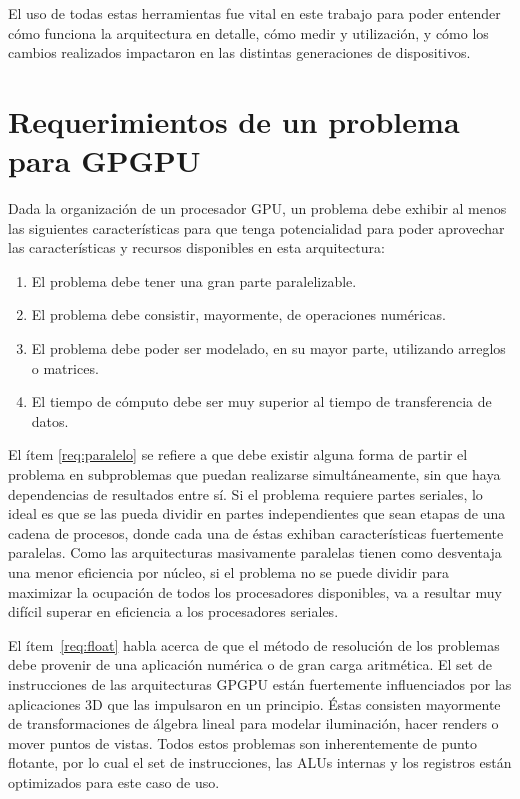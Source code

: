 El uso de todas estas herramientas fue vital en este trabajo para poder entender c\'omo funciona la arquitectura en detalle, c\'omo medir \performance{} y utilizaci\'on, y c\'omo los cambios realizados impactaron en las distintas generaciones de dispositivos.

\section{Requerimientos de un problema para GPGPU}

Dada la organizaci\'on de un procesador GPU, un problema debe exhibir al menos las siguientes caracter\'isticas para que tenga potencialidad para poder aprovechar las caracter\'isticas y recursos disponibles en esta arquitectura:

\begin{enumerate}
  \item \label{req:paralelo} El problema debe tener una gran parte paralelizable.
  \item \label{req:float} El problema debe consistir, mayormente, de operaciones num\'ericas.
  \item \label{req:matrix} El problema debe poder ser modelado, en su mayor parte, utilizando arreglos o matrices.
  \item \label{req:transf} El tiempo de c\'omputo debe ser muy superior al tiempo de transferencia de datos.
\end{enumerate}

El \'item \ref{req:paralelo} se refiere a que debe existir alguna forma de partir el problema en subproblemas que puedan realizarse simult\'aneamente, sin que haya dependencias de
resultados entre s\'i.
Si el problema requiere partes seriales, lo ideal es que se las pueda dividir en partes independientes que sean etapas de una cadena de procesos, donde cada una de \'estas exhiban caracter\'isticas fuertemente paralelas.
Como las arquitecturas masivamente paralelas tienen como desventaja una menor eficiencia por n\'ucleo, si el problema no se puede dividir para maximizar la ocupaci\'on de todos los procesadores disponibles, va a resultar muy dif\'icil superar en eficiencia a los procesadores seriales.

El ítem~\ref{req:float} habla acerca de que el m\'etodo de resoluci\'on de los problemas debe provenir de una aplicaci\'on num\'erica o de gran carga aritm\'etica.
El set de instrucciones de las arquitecturas GPGPU est\'an fuertemente influenciados por las aplicaciones 3D que las impulsaron en un principio.
\'Estas consisten mayormente de transformaciones de \'algebra lineal para modelar iluminaci\'on, hacer renders o mover puntos de vistas.
Todos estos problemas son inherentemente de punto flotante, por lo cual el set de instrucciones, las ALUs internas y los registros est\'an optimizados para este caso de uso.

